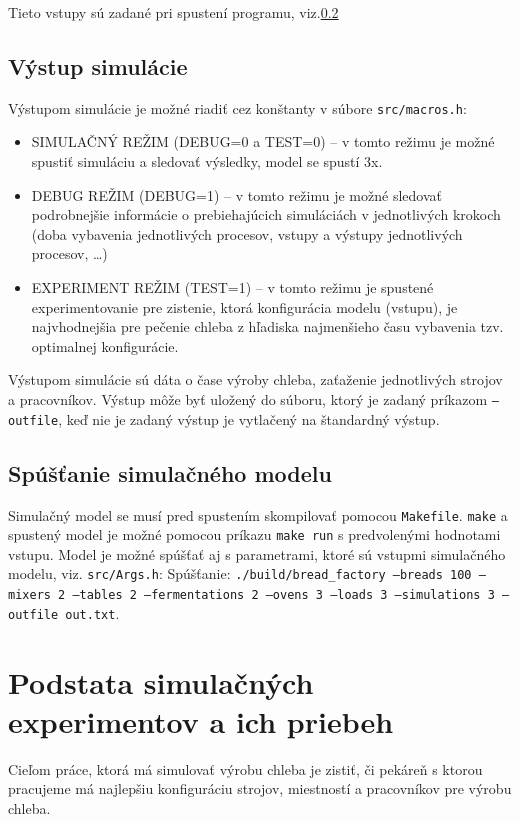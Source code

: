 \documentclass[a4paper, 10pt]{article}
\begin{document}
    Tieto vstupy sú zadané pri spustení programu, viz.\ref{subsec:spousteni-simulacniho-model}

    \subsection{Výstup simulácie}
    Výstupom simulácie je možné riadiť cez konštanty v súbore \texttt{src/macros.h}:
    \begin{itemize}
        \item SIMULAČNÝ REŽIM (DEBUG=0 a TEST=0) -- v tomto režimu je možné spustiť simuláciu a sledovať výsledky, model se spustí 3x.
        \item DEBUG REŽIM (DEBUG=1) -- v tomto režimu je možné sledovať podrobnejšie informácie o prebiehajúcich simuláciách
        v jednotlivých krokoch (doba vybavenia jednotlivých procesov, vstupy a výstupy jednotlivých procesov, \ldots)
        \item EXPERIMENT REŽIM (TEST=1) -- v tomto režimu je spustené experimentovanie pre zistenie,
        ktorá konfigurácia modelu (vstupu), je najvhodnejšia pre pečenie
        chleba z hľadiska najmenšieho času vybavenia tzv. optimalnej konfigurácie.
    \end{itemize}

    Výstupom simulácie sú dáta o čase výroby chleba, zaťaženie jednotlivých strojov a pracovníkov.
    Výstup môže byť uložený do súboru, ktorý je zadaný príkazom \texttt{--outfile}, keď nie je zadaný
    výstup je vytlačený na štandardný výstup.

    \subsection{Spúšťanie simulačného modelu}\label{subsec:spousteni-simulacniho-model}
    Simulačný model se musí pred spustením skompilovať pomocou \texttt{Makefile}.
    \texttt{make} a spustený model je možné pomocou príkazu \texttt{make run} s predvolenými hodnotami vstupu.
    Model je možné spúšťať aj s parametrami, ktoré sú vstupmi simulačného modelu, viz. \texttt{src/Args.h}:
    Spúšťanie: \texttt{./build/bread\_factory --breads 100 --mixers 2 --tables 2
    --fermentations 2 --ovens 3 --loads 3 --simulations 3 --outfile out.txt}.


    \section{Podstata simulačných experimentov a ich priebeh}
    Cieľom práce, ktorá má simulovať výrobu chleba je zistiť, či pekáreň s ktorou pracujeme má najlepšiu konfiguráciu
    strojov, miestností a pracovníkov pre výrobu chleba.
\end{document}
